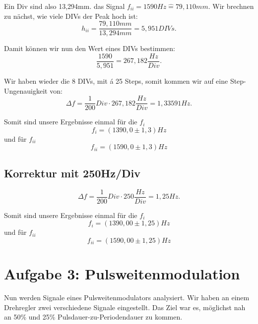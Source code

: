 Ein Div sind also 13,294mm. das Signal $f_{ii} = 1590 Hz \hat = 79,110mm$. Wir brechnen zu nächst, wie viele DIVs der Peak hoch ist:
\begin{equation}
    h_{ii} = \frac{79,110mm}{13,294mm} = 5,951 DIVs.
\end{equation}

Damit können wir nun den Wert eines DIVs bestimmen:
\begin{equation}
    \frac{1590}{5,951} = 267,182 \frac{Hz}{Div}.
\end{equation}

Wir haben wieder die 8 DIVs, mit á 25 Steps, somit kommen wir auf eine Step-Ungenauigkeit von:
\begin{equation}
    \Delta f = \frac{1}{200} Div \cdot 267,182 \frac{Hz}{Div} = 1,33591 Hz.
\end{equation}

Somit sind unsere Ergebnisse einmal für die $f_{i}$
\begin{equation}
    \boxed{
        f_{i} = (1390,0 \pm 1,3) Hz
    }
\end{equation}
und für $f_{ii}$
\begin{equation}
    \boxed{
        f_{ii} = (1590,0 \pm 1,3) Hz
    }
\end{equation}

\subsection*{Korrektur mit 250Hz/Div}
\begin{equation}
    \Delta f = \frac{1}{200} Div \cdot 250 \frac{Hz}{Div} = 1,25 Hz.
\end{equation}

Somit sind unsere Ergebnisse einmal für die $f_{i}$
\begin{equation}
    \boxed{
        f_{i} = (1390,00 \pm 1,25) Hz
    }
\end{equation}
und für $f_{ii}$
\begin{equation}
    \boxed{
        f_{ii} = (1590,00 \pm 1,25) Hz
    }
\end{equation}
\newpage
\onecolumn
\twocolumn


\section{Aufgabe 3: Pulsweitenmodulation}
Nun werden Signale eines Pulsweitenmodulators analysiert. Wir haben an einem Drehregler zwei verschiedene Signale eingestellt. Das Ziel war es, möglichst nah an 50\% und 25\% Pulsdauer-zu-Periodendauer zu kommen.

